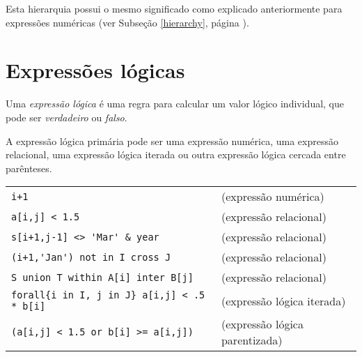 \documentclass[11pt, brazil]{report}
\def\para#1{\noindent{\bf#1}}
\begin{document}

Esta hierarquia possui o mesmo significado como explicado anteriormente
para expressões \linebreak numéricas (ver Subseção \ref{hierarchy}, página \pageref{hierarchy}).


\newpage

\section{Expressões lógicas}

Uma {\it expressão lógica} é uma regra para calcular um valor lógico
individual, que pode ser {\it verdadeiro} ou {\it falso}.

A expressão lógica primária pode ser uma expressão numérica,
uma expressão relacional, uma expressão lógica iterada ou
outra expressão lógica cercada entre parênteses.

\para{Exemplos}

%
%

\noindent
\begin{tabular}{@{}ll@{}}
\verb|i+1| &(expressão numérica)\\
\verb|a[i,j] < 1.5| &(expressão relacional)\\
\verb|s[i+1,j-1] <> 'Mar' & year | &(expressão relacional)\\
\verb|(i+1,'Jan') not in I cross J| &(expressão relacional)\\
\verb|S union T within A[i] inter B[j]| &(expressão relacional)\\
\verb|forall{i in I, j in J} a[i,j] < .5 * b[i]| &(expressão lógica iterada)\\
\verb|(a[i,j] < 1.5 or b[i] >= a[i,j])| &(expressão lógica parentizada)\\
\end{tabular}
\end{document}
